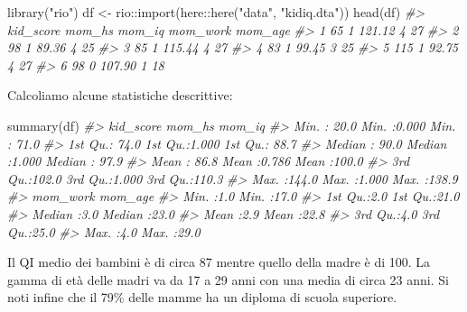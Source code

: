 \documentclass[
  11pt,
]{krantz}
\makeatletter
\newenvironment{Shaded}{\begin{snugshade}}{\end{snugshade}}
\newcommand{\CommentTok}[1]{\textcolor[rgb]{0.37,0.37,0.37}{\textit{#1}}}
\newcommand{\FunctionTok}[1]{\textcolor[rgb]{0,0,0}{#1}}
\newcommand{\NormalTok}[1]{#1}
\newcommand{\OtherTok}[1]{\textcolor[rgb]{0.37,0.37,0.37}{#1}}
\newcommand{\SpecialCharTok}[1]{\textcolor[rgb]{0,0,0}{#1}}
\newcommand{\StringTok}[1]{\textcolor[rgb]{0.5,0.5,0.5}{#1}}
\newenvironment{kframe}{%
\medskip{}
\setlength{\fboxsep}{.8em}
 \def\at@end@of@kframe{}%
 \ifinner\ifhmode%
  \def\at@end@of@kframe{\end{minipage}}%
  \begin{minipage}{\columnwidth}%
 \fi\fi%
 \def\FrameCommand##1{\hskip\@totalleftmargin \hskip-\fboxsep
 \colorbox{shadecolor}{##1}\hskip-\fboxsep
     \hskip-\linewidth \hskip-\@totalleftmargin \hskip\columnwidth}%
 \MakeFramed {\advance\hsize-\width
   \@totalleftmargin\z@ \linewidth\hsize
   \@setminipage}}%
 {\par\unskip\endMakeFramed%
 \at@end@of@kframe}
\renewenvironment{Shaded}{\begin{kframe}}{\end{kframe}}
\theoremstyle{definition}
\theoremstyle{definition}
\theoremstyle{definition}
\theoremstyle{definition}
\theoremstyle{remark}
\makeatother
\begin{document}
\begin{Shaded}
\begin{Highlighting}[]
\FunctionTok{library}\NormalTok{(}\StringTok{"rio"}\NormalTok{)}
\NormalTok{df }\OtherTok{\textless{}{-}}\NormalTok{ rio}\SpecialCharTok{::}\FunctionTok{import}\NormalTok{(here}\SpecialCharTok{::}\FunctionTok{here}\NormalTok{(}\StringTok{"data"}\NormalTok{, }\StringTok{"kidiq.dta"}\NormalTok{))}
\FunctionTok{head}\NormalTok{(df)}
\CommentTok{\#\textgreater{}   kid\_score mom\_hs mom\_iq mom\_work mom\_age}
\CommentTok{\#\textgreater{} 1        65      1 121.12        4      27}
\CommentTok{\#\textgreater{} 2        98      1  89.36        4      25}
\CommentTok{\#\textgreater{} 3        85      1 115.44        4      27}
\CommentTok{\#\textgreater{} 4        83      1  99.45        3      25}
\CommentTok{\#\textgreater{} 5       115      1  92.75        4      27}
\CommentTok{\#\textgreater{} 6        98      0 107.90        1      18}
\end{Highlighting}
\end{Shaded}

Calcoliamo alcune statistiche descrittive:

\begin{Shaded}
\begin{Highlighting}[]
\FunctionTok{summary}\NormalTok{(df)}
\CommentTok{\#\textgreater{}    kid\_score         mom\_hs          mom\_iq     }
\CommentTok{\#\textgreater{}  Min.   : 20.0   Min.   :0.000   Min.   : 71.0  }
\CommentTok{\#\textgreater{}  1st Qu.: 74.0   1st Qu.:1.000   1st Qu.: 88.7  }
\CommentTok{\#\textgreater{}  Median : 90.0   Median :1.000   Median : 97.9  }
\CommentTok{\#\textgreater{}  Mean   : 86.8   Mean   :0.786   Mean   :100.0  }
\CommentTok{\#\textgreater{}  3rd Qu.:102.0   3rd Qu.:1.000   3rd Qu.:110.3  }
\CommentTok{\#\textgreater{}  Max.   :144.0   Max.   :1.000   Max.   :138.9  }
\CommentTok{\#\textgreater{}     mom\_work      mom\_age    }
\CommentTok{\#\textgreater{}  Min.   :1.0   Min.   :17.0  }
\CommentTok{\#\textgreater{}  1st Qu.:2.0   1st Qu.:21.0  }
\CommentTok{\#\textgreater{}  Median :3.0   Median :23.0  }
\CommentTok{\#\textgreater{}  Mean   :2.9   Mean   :22.8  }
\CommentTok{\#\textgreater{}  3rd Qu.:4.0   3rd Qu.:25.0  }
\CommentTok{\#\textgreater{}  Max.   :4.0   Max.   :29.0}
\end{Highlighting}
\end{Shaded}

Il QI medio dei bambini è di circa 87 mentre quello della madre è di 100. La gamma di età delle madri va da 17 a 29 anni con una media di circa 23 anni. Si noti infine che il 79\% delle mamme ha un diploma di scuola superiore.
\end{document}
